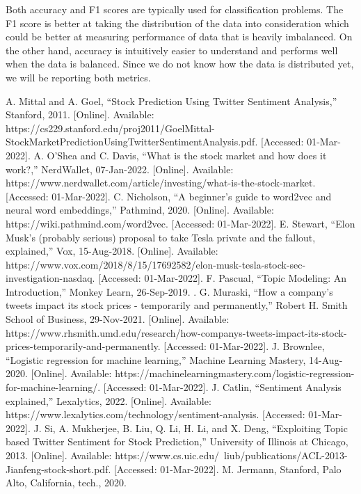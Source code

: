 \documentclass[conference]{IEEEtran}
\begin{document}
Both accuracy and F1 scores are typically used for classification problems. The F1 score is better at taking the distribution of the data into consideration which could be better at measuring performance of data that is heavily imbalanced. On the other hand, accuracy is intuitively easier to understand and performs well when the data is balanced. Since we do not know how the data is distributed yet, we will be reporting both metrics. 
\begin{thebibliography}{00}
     A. Mittal and A. Goel, “Stock Prediction Using Twitter Sentiment Analysis,” Stanford, 2011. [Online]. Available: https://cs229.stanford.edu/proj2011/GoelMittal-StockMarketPredictionUsingTwitterSentimentAnalysis.pdf. [Accessed: 01-Mar-2022].
     A. O'Shea and C. Davis, “What is the stock market and how does it work?,” NerdWallet, 07-Jan-2022. [Online]. Available: https://www.nerdwallet.com/article/investing/what-is-the-stock-market. [Accessed: 01-Mar-2022].
     C. Nicholson, “A beginner's guide to word2vec and neural word embeddings,” Pathmind, 2020. [Online]. Available: https://wiki.pathmind.com/word2vec. [Accessed: 01-Mar-2022].
     E. Stewart, “Elon Musk's (probably serious) proposal to take Tesla private and the fallout, explained,” Vox, 15-Aug-2018. [Online]. Available: https://www.vox.com/2018/8/15/17692582/elon-musk-tesla-stock-sec-investigation-nasdaq. [Accessed: 01-Mar-2022].
     F. Pascual, “Topic Modeling: An Introduction,” Monkey Learn, 26-Sep-2019. .
     G. Muraski, “How a company's tweets impact its stock prices - temporarily and permanently,” Robert H. Smith School of Business, 29-Nov-2021. [Online]. Available: https://www.rhsmith.umd.edu/research/how-companys-tweets-impact-its-stock-prices-temporarily-and-permanently. [Accessed: 01-Mar-2022].
     J. Brownlee, “Logistic regression for machine learning,” Machine Learning Mastery, 14-Aug-2020. [Online]. Available: https://machinelearningmastery.com/logistic-regression-for-machine-learning/. [Accessed: 01-Mar-2022].
     J. Catlin, “Sentiment Analysis explained,” Lexalytics, 2022. [Online]. Available: https://www.lexalytics.com/technology/sentiment-analysis. [Accessed: 01-Mar-2022].
     J. Si, A. Mukherjee, B. Liu, Q. Li, H. Li, and X. Deng, “Exploiting Topic based Twitter Sentiment for Stock Prediction,” University of Illinois at Chicago, 2013. [Online]. Available: https://www.cs.uic.edu/~liub/publications/ACL-2013-Jianfeng-stock-short.pdf. [Accessed: 01-Mar-2022].
     M. Jermann, Stanford, Palo Alto, California, tech., 2020.

\end{thebibliography}
\end{document}
